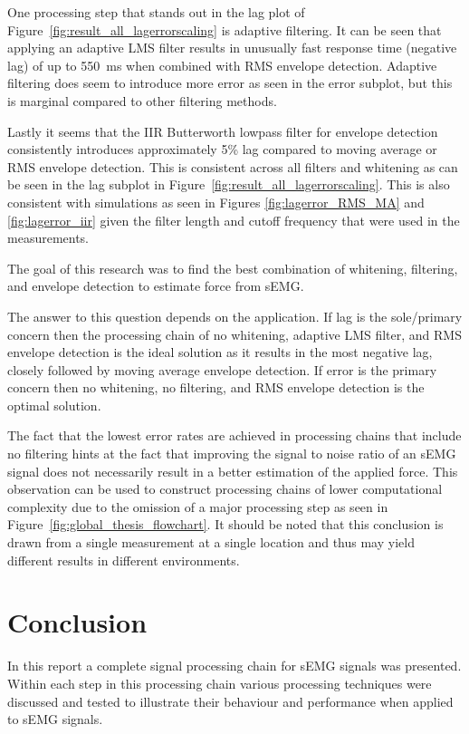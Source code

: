 One processing step that stands out in the lag plot of Figure~\ref{fig:result_all_lagerrorscaling} is adaptive filtering. It can be seen that applying an adaptive LMS filter results in unusually fast response time (negative lag) of up to \SI{550}{\milli\second} when combined with RMS envelope detection. Adaptive filtering does seem to introduce more error as seen in the error subplot, but this is marginal compared to other filtering methods.

Lastly it seems that the IIR Butterworth lowpass filter for envelope detection consistently introduces approximately 5\% lag compared to moving average or RMS envelope detection. This is consistent across all filters and whitening as can be seen in the lag subplot in Figure~\ref{fig:result_all_lagerrorscaling}. This is also consistent with simulations as seen in Figures \ref{fig:lagerror_RMS_MA} and \ref{fig:lagerror_iir} given the filter length and cutoff frequency that were used in the measurements. 

The goal of this research was to find the best combination of whitening, filtering, and envelope detection to estimate force from sEMG. 

The answer to this question depends on the application. If lag is the sole/primary concern then the processing chain of no whitening, adaptive LMS filter, and RMS envelope detection is the ideal solution as it results in the most negative lag, closely followed by moving average envelope detection. If error is the primary concern then no whitening, no filtering, and RMS envelope detection is the optimal solution. 

The fact that the lowest error rates are achieved in processing chains that include no filtering hints at the fact that improving the signal to noise ratio of an sEMG signal does not necessarily result in a better estimation of the applied force. This observation can be used to construct processing chains of lower computational complexity due to the omission of a major processing step as seen in Figure~\ref{fig:global_thesis_flowchart}. It should be noted that this conclusion is drawn from a single measurement at a single location and thus may yield different results in different environments. 

\section{Conclusion}
In this report a complete signal processing chain for sEMG signals was presented. Within each step in this processing chain various processing techniques were discussed and tested to illustrate their behaviour and performance when applied to sEMG signals.

